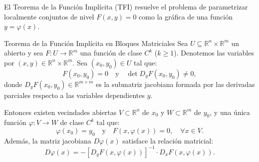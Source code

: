 \documentclass[11pt,a4paper]{article}
\begin{document}
El Teorema de la Función Implícita (TFI) resuelve el problema de parametrizar localmente conjuntos de nivel $F(x,y) = 0$ como la gráfica de una función $y = \varphi(x)$.

\begin{theorempage}{Teorema de la Función Implícita en Bloques Matriciales}
Sea $U \subseteq \mathbb{R}^n \times \mathbb{R}^m$ un abierto y sea $F: U \to \mathbb{R}^m$ una función de clase $C^k$ ($k \ge 1$). Denotemos las variables por $(x, y) \in \mathbb{R}^n \times \mathbb{R}^m$. Sea $(x_0, y_0) \in U$ tal que:
\[
F(x_0, y_0) = 0 \quad \text{y} \quad \det D_y F(x_0, y_0) \neq 0,
\]
donde $D_y F(x_0, y_0) \in \mathbb{R}^{m \times m}$ es la submatriz jacobiana formada por las derivadas parciales respecto a las variables dependientes $y$.

Entonces existen vecindades abiertas $V \subset \mathbb{R}^n$ de $x_0$ y $W \subset \mathbb{R}^m$ de $y_0$, y una única función $\varphi: V \to W$ de clase $C^k$ tal que:
\[
\varphi(x_0) = y_0 \quad \text{y} \quad F(x, \varphi(x)) = 0, \quad \forall x \in V.
\]
Además, la matriz jacobiana $D\varphi(x)$ satisface la relación matricial:
\[
D\varphi(x) = - \left[ D_y F(x, \varphi(x)) \right]^{-1} \cdot D_x F(x, \varphi(x)).
\]
\end{theorempage}
\end{document}
